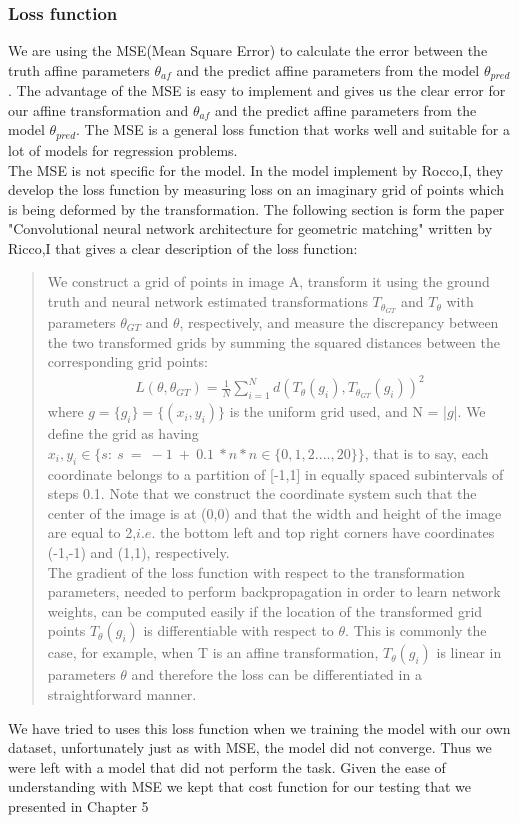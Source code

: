 \subsubsection{Loss function}
 We are using the MSE(Mean Square Error)\cite{mse} to calculate the error between the truth affine parameters $\theta_{af}$ and the predict affine parameters from the model $\theta_{pred}$.
  The advantage of the MSE is easy to implement and gives us the clear error for our affine transformation and $\theta_{af}$ and the predict affine parameters from the model $\theta_{pred}$. The MSE is a general loss function that works well and suitable for a lot of models for regression problems. \\
  The MSE is not specific for the model. In the model implement by Rocco,I\citep{Rocco17}, they develop the loss function by measuring loss on an imaginary grid of points which is being deformed by the transformation. The following section is form the paper "Convolutional neural network architecture for geometric matching" written by Ricco,I\citep{Rocco17} that gives a clear description of the loss function:
  \begin{quote}
  We construct a grid of points in image A, transform it using the ground truth and neural network estimated transformations $T_{\theta_{GT}}$ and $T_{\theta}$ with parameters $\theta_{GT}$ and $\theta$, respectively, and measure the discrepancy between the two transformed grids by summing the squared distances between the corresponding grid points:
  \begin{align*}
  L(\theta, \theta_{GT})= \frac{1}{N}\sum_{i=1}^{N}{d(T_{\theta}(g_i), T_{\theta_{GT}}(g_i) )}^2
  \end{align*}
  where $g = \{g_i\}=\{(x_i, y_i)\}$ is the uniform grid used, and N = |$g$|. We define the grid as having $x_i,y_i \in \{ s:\ s\ =\ -1\ +\ 0.1\ * n*n  \in \{0,1,2....,20 \} \}$, that is to say, each coordinate belongs to a partition of [-1,1] in equally spaced subintervals of steps 0.1. Note that we construct the coordinate system such that the center of the image is at (0,0) and that the width and height of the image are equal to 2,$i.e$. the bottom left and top right corners have coordinates (-1,-1) and (1,1), respectively.\\
   The gradient of the loss function with respect to the
transformation parameters, needed to perform backpropagation in order to learn network weights, can be computed easily if the location of the transformed grid points $T_{\theta}(g_i)$  is differentiable with respect to $\theta$. This is commonly the case, for example, when T is an affine transformation,
$T_{\theta}(g_i)$ is linear in parameters $\theta$ and therefore the loss can be differentiated in a straightforward manner.
\end{quote}   		
  We have tried to uses this loss function when we training the model with our own dataset, unfortunately just as with MSE, the model did not converge. Thus we were left with a model that did not perform the task. Given the ease of understanding with MSE we kept that cost function for our testing that we presented in Chapter 5

